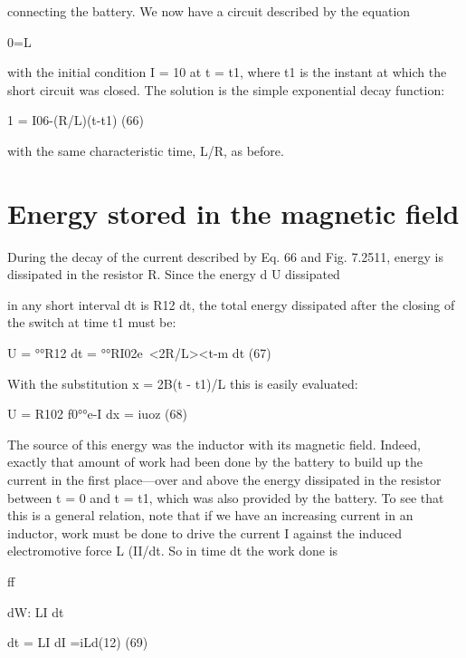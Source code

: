 connecting the battery. We now have a circuit described by the
equation

\begin{equation}
\end{equation}
0=L%

with the initial condition I = 10 at t = t1, where t1 is the instant at
which the short circuit was closed. The solution is the simple exponential
decay function:

\begin{equation}
\end{equation}
1 = I06-(R/L)(t-t1) (66)

with the same characteristic time, L/R, as before.

\section{Energy stored in the magnetic field}
During the decay of the current described by Eq. 66 and Fig. 7.2511,
energy is dissipated in the resistor R. Since the energy d U dissipated

in any short interval dt is R12 dt, the total energy dissipated after
the closing of the switch at time t1 must be:

\begin{equation}
\end{equation}
U = °°R12 dt = °°RI02e~<2R/L><t-m dt (67)

With the substitution x = 2B(t - t1)/L this is easily evaluated:

\begin{equation}
\end{equation}
U = R102 f0°°e-I dx = iuoz (68)

The source of this energy was the inductor with its magnetic field.
Indeed, exactly that amount of work had been done by the battery
to build up the current in the first place---over and above the energy
dissipated in the resistor between t = 0 and t = t1, which was also
provided by the battery. To see that this is a general relation, note
that if we have an increasing current in an inductor, work must be
done to drive the current I against the induced electromotive force
L (II/dt. So in time dt the work done is

ff

\begin{equation}
\end{equation}
dW: LI dt

dt = LI dI =iLd(12) (69)

